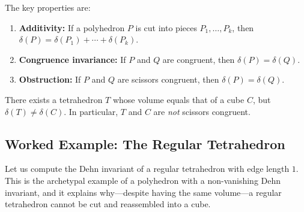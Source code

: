The key properties are:

\begin{enumerate}
    \item \textbf{Additivity:} If a polyhedron $P$ is cut into pieces $P_1, \ldots, P_k$, then $\delta(P) = \delta(P_1) + \cdots + \delta(P_k)$.
    \item \textbf{Congruence invariance:} If $P$ and $Q$ are congruent, then $\delta(P) = \delta(Q)$.
    \item \textbf{Obstruction:} If $P$ and $Q$ are scissors congruent, then $\delta(P) = \delta(Q)$.
\end{enumerate}

\begin{theorem}[Dehn, 1901]
There exists a tetrahedron $T$ whose volume equals that of a cube $C$, but $\delta(T) \neq \delta(C)$. In particular, $T$ and $C$ are \emph{not} scissors congruent.
\end{theorem}

\subsection{Worked Example: The Regular Tetrahedron}

Let us compute the Dehn invariant of a regular tetrahedron with edge length $1$. This is the archetypal example of a polyhedron with a non-vanishing Dehn invariant, and it explains why---despite having the same volume---a regular tetrahedron cannot be cut and reassembled into a cube.

